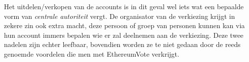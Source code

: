 	Het uitdelen/verkopen van de accounts is in dit geval wel iets wat een bepaalde vorm van \textit{centrale autoriteit} vergt. De organisator van de verkiezing krijgt in zekere zin ook extra macht, deze persoon of groep van personen kunnen kan via hun account immers bepalen wie er zal deelnemen aan de verkiezing. Deze  twee nadelen zijn echter leefbaar, bovendien worden ze te niet gedaan door de reeds genoemde voordelen die  men met EthereumVote verkrijgt.
	
	

	

	
	
	
	
	
	
	
	
	
	
	
	
	
	
	
	
	
	
	
	
	

	








